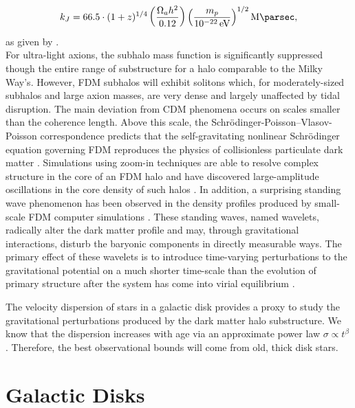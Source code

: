 \documentclass[usenatbib]{mnras}
\newcommand{\poweV}[1]{\SI{e#1}{\electronvolt}}
\begin{document}
\begin{equation}
k_J = 66.5 \cdot (1+z)^{1/4} \left( \frac{\Omega_a h^2}{0.12} \right) \left(\frac{m_p}{\poweV{-22}} \right)^{1/2} \si{\per\mega\parsec},
\end{equation}
\noindent
as given by \citet{axion_cosmology}. \\ For ultra-light axions, the subhalo mass function is significantly suppressed though the entire range of substructure for a halo comparable to the Milky Way’s. However, FDM subhalos will exhibit solitons which, for moderately-sized subhalos and large axion masses, are very dense and largely unaffected by tidal disruption. The main deviation from CDM phenomena occurs on scales smaller than the coherence length. Above this scale, the Schr\"{o}dinger-Poisson–Vlasov-Poisson correspondence predicts that the self-gravitating nonlinear Schr\"{o}dinger equation governing FDM reproduces the physics of collisionless particulate dark matter \citep{Schrodinger-Poisson}. Simulations using zoom-in techniques are able to resolve complex structure in the core of an FDM halo and have discovered large-amplitude oscillations in the core density of such halos \citep{structure-FDM-halos}. In addition, a surprising standing wave phenomenon has been observed in the density profiles produced by small-scale FDM computer simulations \citep{cold_and_fuzzy}. These standing waves, named wavelets, radically alter the dark matter profile and may, through gravitational interactions, disturb the baryonic components in directly measurable ways. The primary effect of these wavelets is to introduce time-varying perturbations to the gravitational potential on a much shorter time-scale than the evolution of primary structure after the system has come into virial equilibrium \citep{Schrodinger-Poisson}. 
\par
	The velocity dispersion of stars in a galactic disk provides a proxy to study the gravitational perturbations produced by the dark matter halo substructure. We know that the dispersion increases with age via an approximate power law $\sigma \propto t^\beta$ \citep{heating_history}. Therefore, the best observational bounds will come from old, thick disk stars.  

\section{Galactic Disks}
\end{document}
